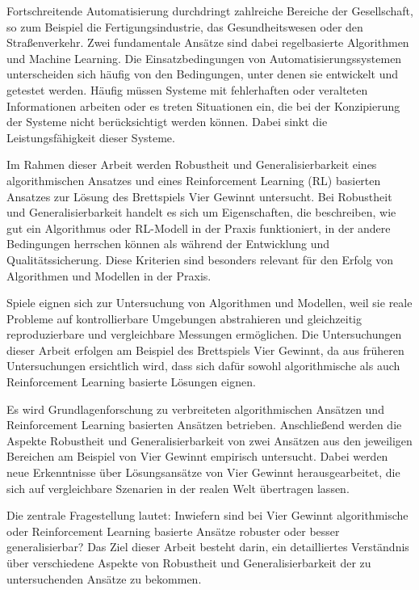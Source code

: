 Fortschreitende Automatisierung durchdringt zahlreiche Bereiche der Gesellschaft, so zum Beispiel die Fertigungsindustrie, das Gesundheitswesen oder den Straßenverkehr. Zwei fundamentale Ansätze sind dabei regelbasierte Algorithmen und Machine Learning. Die Einsatzbedingungen von Automatisierungssystemen unterscheiden sich häufig von den Bedingungen, unter denen sie entwickelt und getestet werden. Häufig müssen Systeme mit fehlerhaften oder veralteten Informationen arbeiten oder es treten Situationen ein, die bei der Konzipierung der Systeme nicht berücksichtigt werden können. Dabei sinkt die Leistungsfähigkeit dieser Systeme.

Im Rahmen dieser Arbeit werden Robustheit und Generalisierbarkeit eines algorithmischen Ansatzes und eines Reinforcement Learning (RL) basierten Ansatzes zur Lösung des Brettspiels \glqq Vier Gewinnt\grqq{} untersucht. Bei Robustheit und Generalisierbarkeit handelt es sich um Eigenschaften, die beschreiben, wie gut ein Algorithmus oder RL-Modell in der Praxis funktioniert, in der andere Bedingungen herrschen können als während der Entwicklung und Qualitätssicherung. Diese Kriterien sind besonders relevant für den Erfolg von Algorithmen und Modellen in der Praxis.

Spiele eignen sich zur Untersuchung von Algorithmen und Modellen, weil sie reale Probleme auf kontrollierbare Umgebungen abstrahieren und gleichzeitig reproduzierbare und vergleichbare Messungen ermöglichen. Die Untersuchungen dieser Arbeit erfolgen am Beispiel des Brettspiels \glqq Vier Gewinnt\grqq{}, da aus früheren Untersuchungen ersichtlich wird, dass sich dafür sowohl algorithmische als auch Reinforcement Learning basierte Lösungen eignen.

Es wird Grundlagenforschung zu verbreiteten algorithmischen Ansätzen und Reinforcement Learning basierten Ansätzen betrieben. Anschließend werden die Aspekte Robustheit und Generalisierbarkeit von zwei Ansätzen aus den jeweiligen Bereichen am Beispiel von Vier Gewinnt empirisch untersucht. Dabei werden neue Erkenntnisse über Lösungsansätze von Vier Gewinnt herausgearbeitet, die sich auf vergleichbare Szenarien in der realen Welt übertragen lassen.

Die zentrale Fragestellung lautet: Inwiefern sind bei Vier Gewinnt algorithmische oder Reinforcement Learning basierte Ansätze robuster oder besser generalisierbar? Das Ziel dieser Arbeit besteht darin, ein detailliertes Verständnis über verschiedene Aspekte von Robustheit und Generalisierbarkeit der zu untersuchenden Ansätze zu bekommen.
